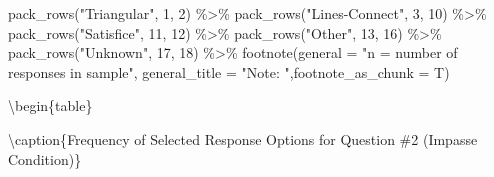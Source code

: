 \documentclass[
  letterpaper,
  DIV=11,
  numbers=noendperiod]{scrreprt}
\newenvironment{Shaded}{\begin{snugshade}}{\end{snugshade}}
\newcommand{\AttributeTok}[1]{\textcolor[rgb]{0.40,0.45,0.13}{#1}}
\newcommand{\DecValTok}[1]{\textcolor[rgb]{0.68,0.00,0.00}{#1}}
\newcommand{\FunctionTok}[1]{\textcolor[rgb]{0.28,0.35,0.67}{#1}}
\newcommand{\NormalTok}[1]{\textcolor[rgb]{0.00,0.23,0.31}{#1}}
\newcommand{\SpecialCharTok}[1]{\textcolor[rgb]{0.37,0.37,0.37}{#1}}
\newcommand{\StringTok}[1]{\textcolor[rgb]{0.13,0.47,0.30}{#1}}
\begin{document}
\begin{Shaded}
\begin{Highlighting}[]
  \FunctionTok{pack\_rows}\NormalTok{(}\StringTok{"Triangular"}\NormalTok{, }\DecValTok{1}\NormalTok{, }\DecValTok{2}\NormalTok{) }\SpecialCharTok{\%\textgreater{}\%}
  \FunctionTok{pack\_rows}\NormalTok{(}\StringTok{"Lines{-}Connect"}\NormalTok{, }\DecValTok{3}\NormalTok{, }\DecValTok{10}\NormalTok{) }\SpecialCharTok{\%\textgreater{}\%} 
  \FunctionTok{pack\_rows}\NormalTok{(}\StringTok{"Satisfice"}\NormalTok{, }\DecValTok{11}\NormalTok{, }\DecValTok{12}\NormalTok{) }\SpecialCharTok{\%\textgreater{}\%}
  \FunctionTok{pack\_rows}\NormalTok{(}\StringTok{"Other"}\NormalTok{, }\DecValTok{13}\NormalTok{, }\DecValTok{16}\NormalTok{)  }\SpecialCharTok{\%\textgreater{}\%} 
  \FunctionTok{pack\_rows}\NormalTok{(}\StringTok{"Unknown"}\NormalTok{, }\DecValTok{17}\NormalTok{, }\DecValTok{18}\NormalTok{)  }\SpecialCharTok{\%\textgreater{}\%} 
  \FunctionTok{footnote}\NormalTok{(}\AttributeTok{general =} \StringTok{"n = number of responses in sample"}\NormalTok{, }
           \AttributeTok{general\_title =} \StringTok{"Note: "}\NormalTok{,}\AttributeTok{footnote\_as\_chunk =}\NormalTok{ T) }
\end{Highlighting}
\end{Shaded}

\textbackslash begin\{table\}

\textbackslash caption\{\label{tab:Q2-IMPASSE-RESPONSES}Frequency of
Selected Response Options for Question \#2 (Impasse Condition)\}
\centering
\end{document}
